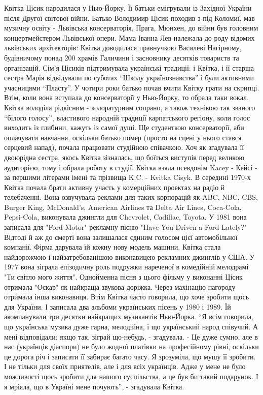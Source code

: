 Квітка Цісик народилася у Нью-Йорку. Її батьки емігрували із Західної України після Другої світової війни. Батько Володимир Цісик походив з-під Коломиї, мав музичну освіту - Львівська консерваторія, Прага, Мюнхен, до війни був головним концертмейстером Львівської опери. 
Мама Іванна Лев належала до роду відомих львівських архітекторів: Квітка доводилася правнучкою Василеві Нагірному, будівничому понад 200 храмів Галичини і засновнику десятків товариств та організацій. 
Сім'я Цісиків підтримувала українські традиції: і Квітка, і її старша сестра Марія відвідували по суботах “Школу українознавства” і були активними учасницями “Пласту”. 
У чотири роки батько почав вчити Квітку грати на скрипці. Втім, коли вона вступала до консерваторії у Нью-Йорку, то обрала таки вокал. Квітка володіла рідкісним - колоратурним сопрано, а також технікою так званого “білого голосу”, властивого народній традиції карпатського регіону, коли голос виходить із глибини, кажуть із самої душі.
Ще студенткою консерваторії, аби оплачувати навчання, оскільки батько помер (просто на сцені у нього стався серцевий напад), почала працювати студійною співачкою. Хоч як згадувала її двоюрідна сестра, якось Квітка зізналась, що боїться виступів перед великою аудиторією, тому і обрала роботу в студії.
Квітка взяла псевдонім Kacey - Кейсі - за першими літерами імені та прізвища K.C. - Kvitka Cisyk. 
В середині 1970-х Квітка почала брати активну участь у комерційних проектах на радіо й телебаченні. Вона озвучувала реклами для таких корпорацій як ABC, NBC, CBS, Burger King, McDonald's, American Airlines та Delta Air Lines, Coca-Cola, Pepsi-Cola, виконувала джингли для Chevrolet, Cadillac, Toyota.
У 1981 вона записала для "Ford Motor" рекламну пісню "Have You Driven a Ford Lately?" Відтоді й аж до смерті вона залишалася єдиним голосом цієї автомобільної компанії. Фірма дарувала їй кожну нову модель машини. 
Квітка стала найдорожчою і найзатребованішою виконавицею рекламних джинглів у США. 
У 1977 вона зіграла епізодичну роль подружки нареченої в комедійній мелодрамі "Ти світло мого життя". Однойменна пісня з цього фільму у виконанні Цісик отримала "Оскар" як найкраща звукова доріжка. Через махінацію нагороду отримала інша виконавиця.
Втім Квітка часто говорила, що хоче зробити щось для України. І записала два альбоми українських пісень у 1980 і 1989. Їй акомпанували три десятки найкращих музикантів Нью-Йорка. 
“Я всім говорила, що українська музика дуже гарна, мелодійна, і що український народ співучий. А мені відповідали: якщо так, зіграй що-небудь, - згадувала. - Це дуже сумно, але в нас (українців діаспори) не було жодної платівки на професійному рівні, оскільки це дорога річ і записати її забирає багато часу. Я зрозуміла, що мушу її зробити. І не тільки для своїх приятелів, але і для всіх українців. Адже у мене не було можливості щось зробити для нашого суспільства, а це був би такий подарунок. І я мріяла, що в Україні мене почують”, - згадувала Квітка.
